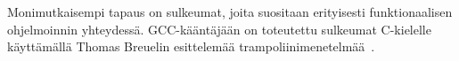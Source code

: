 %
%
%

Monimutkaisempi tapaus on sulkeumat, joita suositaan erityisesti
funktionaalisen ohjelmoinnin yhteydessä. GCC-kääntäjään on toteutettu sulkeumat
C-kielelle käyttämällä Thomas Breuelin esittelemää
trampoliinimenetelmää~\citep{gccnested, cppclosure}.

%

